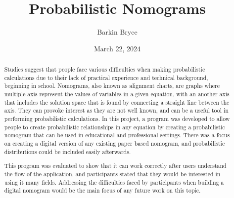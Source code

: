 \documentclass{l4proj}
\begin{document}
\title{Probabilistic Nomograms}
\author{Barkin Bryce}
\date{March 22, 2024}

\maketitle

\begin{abstract}
    Studies suggest that people face various difficulties when making probabilistic calculations due to their lack of practical experience and technical background, beginning in school. 
    Nomograms, also known as alignment charts, are graphs where multiple axis represent the values of variables in a given equation, with an another axis that includes the solution space that is found by connecting a straight line between the axis. They can provoke interest as they are not well known, and can be a useful tool in performing probabilistic calculations. 
    In this project, a program was developed to allow people to create probabilistic relationships in any equation by creating a probabilistic nomogram that can be used in educational and professional settings. There was a focus on creating a digital version of any existing paper based nomogram, and probabilistic distributions could be included easily afterwards. 

    This program was evaluated to show that it can work correctly after users understand the flow of the application, and participants stated that they would be interested in using it many fields. Addressing the difficulties faced by participants when building a digital nomogram would be the main focus of any future work on this topic. 
\end{abstract}


%
%
\def\consentname {Barkin Bryce} %
\def\consentdate {20th January 2024} %
%
\educationalconsent
\end{document}
